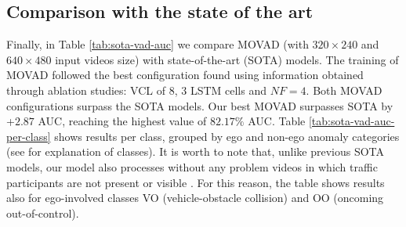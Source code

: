 \subsection{Comparison with the state of the art}
\label{comparison-with-sota}
Finally, in Table \ref{tab:sota-vad-auc} we compare MOVAD (with $320\times240$ and $640\times480$ input videos size) with state-of-the-art (SOTA) models.
The training of MOVAD followed the best configuration found using information obtained through ablation studies: VCL of 8, 3 LSTM cells and $\mathit{NF}=4$.
Both MOVAD configurations surpass the SOTA models.
Our best MOVAD surpasses SOTA by +$2.87$ AUC, reaching the highest value of $82.17\%$ AUC.
Table \ref{tab:sota-vad-auc-per-class} shows results per class, grouped by ego and non-ego anomaly categories (see \cite{9712446} for explanation of classes).
It is worth to note that, unlike previous SOTA models, our model also processes without any problem videos in which traffic participants are not present or visible .
For this reason, the table shows results also for ego-involved classes VO (vehicle-obstacle collision) and OO (oncoming out-of-control).

